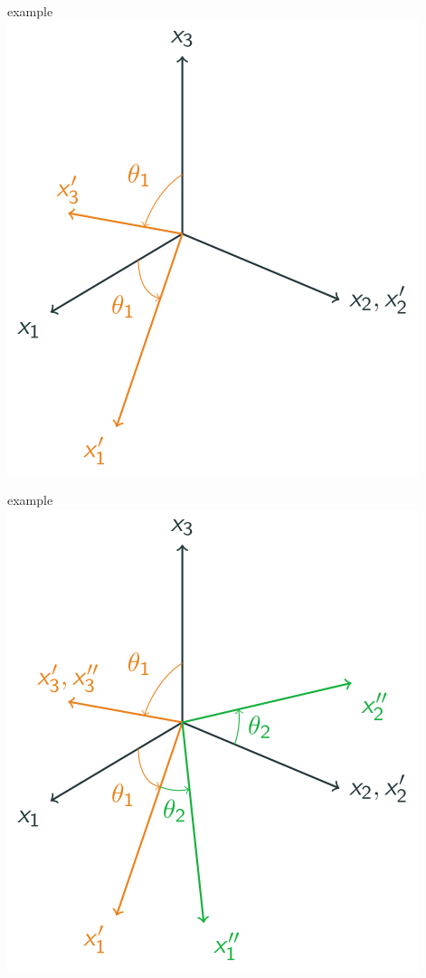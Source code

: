 \documentclass[
  letterpaper,
  ignorenonframetext,
  aspectratio=43,
  handout,
  12pt]{beamer}
\let\Oldincludegraphics\includegraphics
\renewcommand{\includegraphics}[2][]{\Oldincludegraphics[width=\textwidth,height=0.7\textheight,keepaspectratio]{#2}}
\begin{document}
\begin{frame}{example}
\protect\hypertarget{example-1}{}
\includegraphics{../images/3d-y-rot.svg}
\end{frame}

\begin{frame}{example}
\protect\hypertarget{example-2}{}
\includegraphics{../images/3d-z-rot.svg}
\end{frame}
\end{document}

